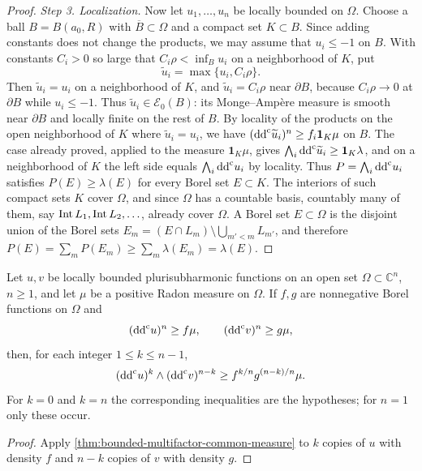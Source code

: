 \begin{proof}
\emph{Step 3. Localization.}
Now let $u_1,\ldots,u_n$ be locally bounded on $\Omega$. Choose a ball $B=B(a_0,R)$ with $\overline B\subset\Omega$ and a compact set $K\subset B$. Since adding constants does not change the products, we may assume that $u_i\leq-1$ on $B$. With constants $C_i>0$ so large that $C_i\rho<\inf_Bu_i$ on a neighborhood of $K$, put
\[
 \widetilde u_i=\max\{u_i,C_i\rho\}.
\]
Then $\widetilde u_i=u_i$ on a neighborhood of $K$, and $\widetilde u_i=C_i\rho$ near $\partial B$, because $C_i\rho\to0$ at $\partial B$ while $u_i\leq-1$. Thus $\widetilde u_i\in\mathcal E_0(B)$: its Monge--Amp\`ere measure is smooth near $\partial B$ and locally finite on the rest of $B$. By locality of the products on the open neighborhood of $K$ where $\widetilde u_i=u_i$, we have $(\mathrm{dd}^{\mathrm{c}}\widetilde u_i)^n\geq f_i\mathbf1_K\mu$ on $B$. The case already proved, applied to the measure $\mathbf1_K\mu$, gives $\bigwedge_i\mathrm{dd}^{\mathrm{c}}\widetilde u_i\geq\mathbf1_K\lambda$, and on a neighborhood of $K$ the left side equals $\bigwedge_i\mathrm{dd}^{\mathrm{c}} u_i$ by locality. Thus $P=\bigwedge_i\mathrm{dd}^{\mathrm{c}} u_i$ satisfies $P(E)\geq\lambda(E)$ for every Borel set $E\subset K$. The interiors of such compact sets $K$ cover $\Omega$, and since $\Omega$ has a countable basis, countably many of them, say $\operatorname{Int} L_1,\operatorname{Int} L_2,\ldots$, already cover $\Omega$. A Borel set $E\subset\Omega$ is the disjoint union of the Borel sets $E_m=(E\cap L_m)\setminus\bigcup_{m'<m}L_{m'}$, and therefore $P(E)=\sum_mP(E_m)\geq\sum_m\lambda(E_m)=\lambda(E)$.
\end{proof}

\begin{corollary}\label{cor:bounded-common-measure-mixed}
Let $u,v$ be locally bounded plurisubharmonic functions on an open set $\Omega\subset\mathbb C^n$, $n\geq1$, and let $\mu$ be a positive Radon measure on $\Omega$. If $f,g$ are nonnegative Borel functions on $\Omega$ and
\[
 (\mathrm{dd}^{\mathrm{c}} u)^n\geq f\mu,\qquad(\mathrm{dd}^{\mathrm{c}} v)^n\geq g\mu,
\]
then, for each integer $1\leq k\leq n-1$,
\begin{equation}\label{eq:bounded-common-measure-mixed}
 (\mathrm{dd}^{\mathrm{c}} u)^k\wedge(\mathrm{dd}^{\mathrm{c}} v)^{n-k}
                       \geq f^{k/n}g^{(n-k)/n}\mu.
\end{equation}
For $k=0$ and $k=n$ the corresponding inequalities are the hypotheses; for $n=1$ only these occur.
\end{corollary}
\begin{proof}
Apply \cref{thm:bounded-multifactor-common-measure} to $k$ copies of $u$ with density $f$ and $n-k$ copies of $v$ with density $g$.
\end{proof}

